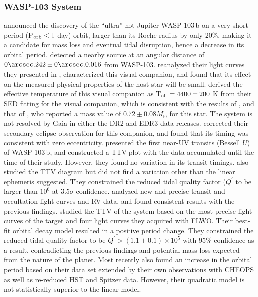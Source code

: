 \documentclass[a4paper,fleqn,usenatbib]{mnras}
\begin{document}
\subsubsection{WASP-103 System}
\citet{2014A&A...562L...3G} announced the discovery of the ``ultra'' hot-Jupiter WASP-103\,b on a very short-period (P$_{\rm orb}< 1$ day) orbit, larger than its Roche radius by only 20\%, making it a candidate for mass loss and eventual tidal disruption, hence a decrease in its orbital period. \citet{2015A&A...579A.129W} detected a nearby source at an angular distance of $0\arcsec.242 \pm 0\arcsec.0.016$ from WASP-103. \citet{2016MNRAS.463...37S} reanalyzed their light curves they presented in \citet{2015MNRAS.447..711S}, characterized this visual companion, and found that its effect on the measured physical properties of the host star will be small. \citet{2017AJ....153...34C} derived the effective temperature of this visual companion as T$_{\rm eff} = 4400 \pm 200$ K from their SED fitting for the visual companion, which is consistent with the results of \cite{2015ApJ...800..138N}, and that of \citet{2015MNRAS.447..711S}, who reported a mass value of $0.72 \pm 0.08 M_{\odot}$ for this star. The system is not resolved by Gaia in either the DR2 and EDR3 data releases. \citet{2017AJ....153...34C} corrected their secondary eclipse observation for this companion, and found that its timing was consistent with zero eccentricity. \citet{2017MNRAS.472.3871T} presented the first near-UV transits (Bessell $U$) of WASP-103\,b, and constructed a TTV plot with the data accumulated until the time of their study. However, they found no variation in its transit timings. \citet{2018AcA....68..371M} also studied the TTV diagram but did not find a variation other than the linear ephemeris suggested. They constrained the reduced tidal quality factor ($Q^{\prime}$ to be larger than $10^6$ at $3.5\sigma$ confidence. \citet{2018MNRAS.474.2334D} analyzed new and precise transit and occultation light curves and RV data, and found consistent results with the previous findings. \citet{2020AJ....159..150P} studied the TTV of the system based on the most precise light curves of the target and four light curves they acquired with FLWO. Their best-fit orbital decay model resulted in a positive period change. They constrained the reduced tidal quality factor to be $Q^{\prime} > (1.1 \pm 0.1) \times 10^5$ with 95\% confidence as a result, contradicting the previous findings and potential mass-loss expected from the nature of the planet. Most recently \citet{2022A&A...658C...1B} also found an increase in the orbital period based on their data set extended by their own observations with CHEOPS as well as re-reduced HST and Spitzer data. However, their quadratic model is not statistically superior to the linear model.
\end{document}
